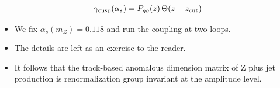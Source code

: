 \begin{equation}
  \gamma_{\rm cusp}(\alpha_s) = P_{gg}(z) \, \Theta(z - z_{\rm cut})
  \label{eq:1}
\end{equation}

\begin{itemize}
  \item We fix $\alpha_s(m_Z) = 0.118$ and run the coupling at two loops.
  \item The details are left as an exercise to the reader.
  \item It follows that the track-based anomalous dimension matrix of Z plus jet production is renormalization group invariant at the amplitude level.
\end{itemize}

